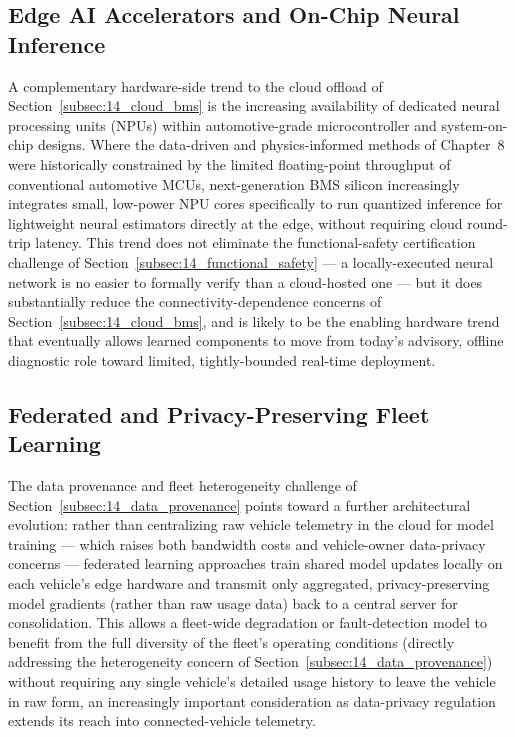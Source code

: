 \subsection{Edge AI Accelerators and On-Chip Neural Inference}
\label{subsec:14_edge_ai}

A complementary hardware-side trend to the cloud offload of Section~\ref{subsec:14_cloud_bms} is the increasing availability of dedicated neural processing units (NPUs) within automotive-grade microcontroller and system-on-chip designs. Where the data-driven and physics-informed methods of Chapter~8 were historically constrained by the limited floating-point throughput of conventional automotive MCUs, next-generation BMS silicon increasingly integrates small, low-power NPU cores specifically to run quantized inference for lightweight neural estimators directly at the edge, without requiring cloud round-trip latency. This trend does not eliminate the functional-safety certification challenge of Section~\ref{subsec:14_functional_safety} — a locally-executed neural network is no easier to formally verify than a cloud-hosted one — but it does substantially reduce the connectivity-dependence concerns of Section~\ref{subsec:14_cloud_bms}, and is likely to be the enabling hardware trend that eventually allows learned components to move from today's advisory, offline diagnostic role toward limited, tightly-bounded real-time deployment.

\subsection{Federated and Privacy-Preserving Fleet Learning}
\label{subsec:14_federated}

The data provenance and fleet heterogeneity challenge of Section~\ref{subsec:14_data_provenance} points toward a further architectural evolution: rather than centralizing raw vehicle telemetry in the cloud for model training — which raises both bandwidth costs and vehicle-owner data-privacy concerns — federated learning approaches train shared model updates locally on each vehicle's edge hardware and transmit only aggregated, privacy-preserving model gradients (rather than raw usage data) back to a central server for consolidation. This allows a fleet-wide degradation or fault-detection model to benefit from the full diversity of the fleet's operating conditions (directly addressing the heterogeneity concern of Section~\ref{subsec:14_data_provenance}) without requiring any single vehicle's detailed usage history to leave the vehicle in raw form, an increasingly important consideration as data-privacy regulation extends its reach into connected-vehicle telemetry.

